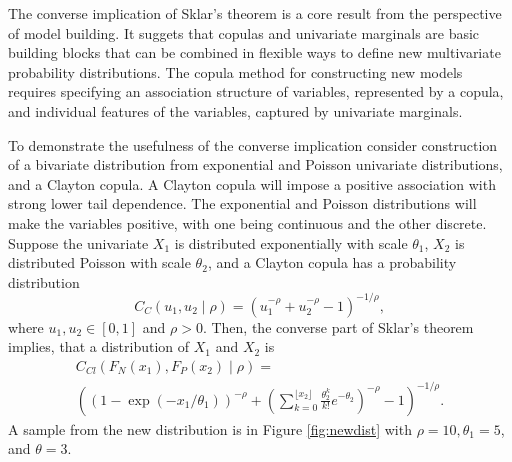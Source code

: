 \documentclass[12pt]{article}
\begin{document}
The converse implication of Sklar's theorem is a core result from the perspective of model building. It suggets that copulas and univariate marginals are basic building blocks that can be
combined in flexible ways to define new multivariate probability distributions. The copula method for constructing new models requires specifying an association structure of variables, represented by a copula, and individual features of the variables,  captured by univariate marginals. 

To demonstrate the usefulness of the converse implication consider construction of a bivariate distribution from exponential and Poisson univariate distributions, and a Clayton copula. A Clayton copula will impose a positive association with strong lower tail dependence. The exponential and Poisson distributions will make the variables positive, with one being continuous and the other discrete. Suppose the univariate $X_1$ is distributed exponentially with scale $\theta_1$, $X_2$ is distributed Poisson with scale $\theta_2$, and a Clayton copula has a probability distribution
\begin{equation}
C_C(u_1, u_2 \mid \rho) = \left(u_1^{-\rho} + u_2^{-\rho} - 1\right)^{-1/\rho},
\end{equation}
where $u_1, u_2 \in [0, 1]$ and $\rho > 0$. Then, the converse part of Sklar's theorem implies, that a distribution of $X_1$ and $X_2$ is
\begin{eqnarray}
\label{eqn:newdist}
C_{Cl}(F_N(x_1), F_P(x_2) \mid \rho) = \\ \nonumber
\left(\left(1 - \exp(-x_1/\theta_1)\right)^{-\rho} + \left(\sum_{k = 0}^{\lfloor{x_2}\rfloor}\frac{\theta_2^k}{k!}e^{-\theta_2}\right)^{-\rho} - 1\right)^{-1/\rho}.
\end{eqnarray}
A sample from the new distribution is in Figure \ref{fig:newdist} with $\rho = 10, \theta_1 = 5$, and $\theta = 3$.
%
\end{document}
